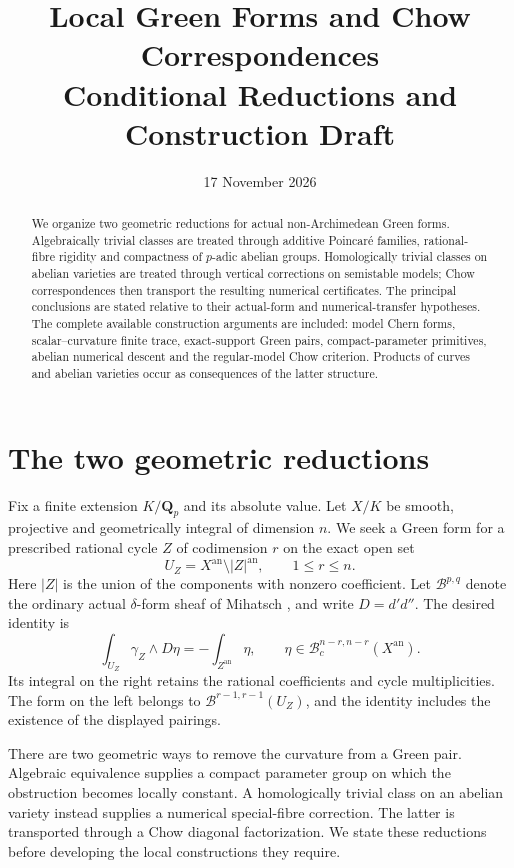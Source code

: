 \documentclass[11pt]{article}
\title{Local Green Forms and Chow Correspondences\\Conditional Reductions and Construction Draft}
\author{}
\date{17 November 2026}
\theoremstyle{definition}
\theoremstyle{remark}
\numberwithin{equation}{section}
\newcommand{\an}{\mathrm{an}}
\newcommand{\B}{\mathcal B}
\begin{document}
\maketitle
\begin{abstract}
We organize two geometric reductions for actual non-Archimedean Green forms. Algebraically trivial classes are treated through additive Poincar\'e families, rational-fibre rigidity and compactness of $p$-adic abelian groups. Homologically trivial classes on abelian varieties are treated through vertical corrections on semistable models; Chow correspondences then transport the resulting numerical certificates. The principal conclusions are stated relative to their actual-form and numerical-transfer hypotheses. The complete available construction arguments are included: model Chern forms, scalar--curvature finite trace, exact-support Green pairs, compact-parameter primitives, abelian numerical descent and the regular-model Chow criterion. Products of curves and abelian varieties occur as consequences of the latter structure.
\end{abstract}

\tableofcontents

\section{The two geometric reductions}\label{sec:construction-introduction}

Fix a finite extension $K/\mathbf Q_p$ and its absolute value. Let $X/K$ be smooth, projective and geometrically integral of dimension $n$. We seek a Green form for a prescribed rational cycle $Z$ of codimension $r$ on the exact open set
\[
 U_Z=X^{\an}\setminus |Z|^{\an},\qquad 1\le r\le n.
\]
Here $|Z|$ is the union of the components with nonzero coefficient. Let $\B^{p,q}$ denote the ordinary actual $\delta$-form sheaf of Mihatsch \cite{M}, and write $D=d'd''$. The desired identity is
\begin{equation}\label{eq:main-green}
 \int_{U_Z}\gamma_Z\wedge D\eta
 =-\int_{Z^{\an}}\eta,
 \qquad \eta\in\B_c^{n-r,n-r}(X^{\an}).
\end{equation}
Its integral on the right retains the rational coefficients and cycle multiplicities. The form on the left belongs to $\B^{r-1,r-1}(U_Z)$, and the identity includes the existence of the displayed pairings.

There are two geometric ways to remove the curvature from a Green pair. Algebraic equivalence supplies a compact parameter group on which the obstruction becomes locally constant. A homologically trivial class on an abelian variety instead supplies a numerical special-fibre correction. The latter is transported through a Chow diagonal factorization. We state these reductions before developing the local constructions they require.
\end{document}
